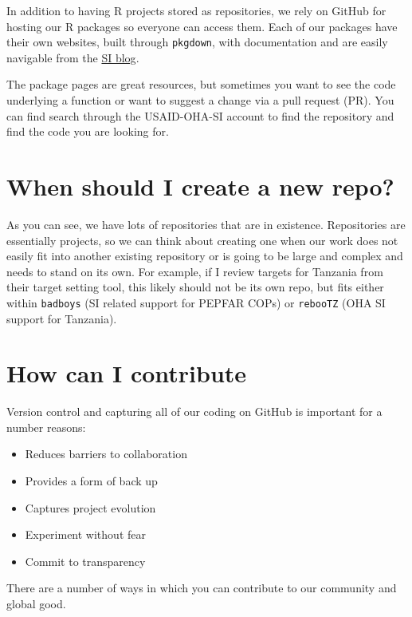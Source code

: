 \documentclass[
  letterpaper,
  DIV=11,
  numbers=noendperiod]{scrreprt}
\providecommand{\tightlist}{%
  \setlength{\itemsep}{0pt}\setlength{\parskip}{0pt}}\usepackage{longtable,booktabs,array}
\begin{document}
In addition to having R projects stored as repositories, we rely on
GitHub for hosting our R packages so everyone can access them. Each of
our packages have their own websites, built through \texttt{pkgdown},
with documentation and are easily navigable from the
\href{https://usaid-oha-si.github.io/tools/}{SI blog}.

The package pages are great resources, but sometimes you want to see the
code underlying a function or want to suggest a change via a pull
request (PR). You can find search through the USAID-OHA-SI account to
find the repository and find the code you are looking for.

\hypertarget{when-should-i-create-a-new-repo}{%
\section{When should I create a new
repo?}\label{when-should-i-create-a-new-repo}}

As you can see, we have lots of repositories that are in existence.
Repositories are essentially projects, so we can think about creating
one when our work does not easily fit into another existing repository
or is going to be large and complex and needs to stand on its own. For
example, if I review targets for Tanzania from their target setting
tool, this likely should not be its own repo, but fits either within
\texttt{badboys} (SI related support for PEPFAR COPs) or
\texttt{rebooTZ} (OHA SI support for Tanzania).

\hypertarget{how-can-i-contribute}{%
\section{How can I contribute}\label{how-can-i-contribute}}

Version control and capturing all of our coding on GitHub is important
for a number reasons:

\begin{itemize}
\tightlist
\item
  Reduces barriers to collaboration
\item
  Provides a form of back up
\item
  Captures project evolution
\item
  Experiment without fear
\item
  Commit to transparency
\end{itemize}

There are a number of ways in which you can contribute to our community
and global good.
\end{document}
